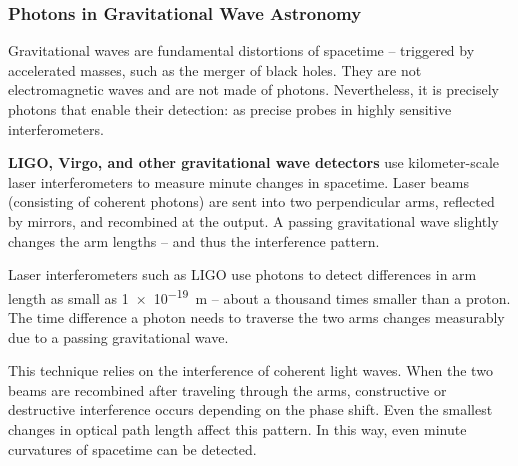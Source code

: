 \subsubsection{Photons in Gravitational Wave Astronomy}

Gravitational waves are fundamental distortions of spacetime – triggered by accelerated masses, such as the merger of black holes. They are not electromagnetic waves and are not made of photons. Nevertheless, it is precisely photons that enable their detection: as precise probes in highly sensitive interferometers.

\vspace{0.5em}
\textbf{LIGO, Virgo, and other gravitational wave detectors} use kilometer-scale laser interferometers to measure minute changes in spacetime. Laser beams (consisting of coherent photons) are sent into two perpendicular arms, reflected by mirrors, and recombined at the output. A passing gravitational wave slightly changes the arm lengths – and thus the interference pattern.

\vspace{1em}
\begin{tcolorbox}[physikbox, title=Photons as a Tool for Measuring Spacetime Curvature]
	\label{box:messwerkzeug}
	\small
	Laser interferometers such as LIGO use photons to detect differences in arm length as small as \SI{1e-19}{m} – about a thousand times smaller than a proton. The time difference a photon needs to traverse the two arms changes measurably due to a passing gravitational wave.
\end{tcolorbox}

This technique relies on the interference of coherent light waves. When the two beams are recombined after traveling through the arms, constructive or destructive interference occurs depending on the phase shift. Even the smallest changes in optical path length affect this pattern. In this way, even minute curvatures of spacetime can be detected.

